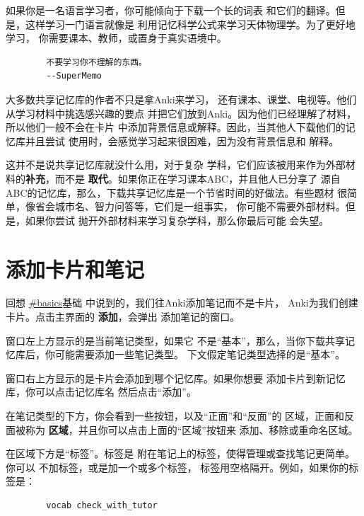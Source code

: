 \documentclass[a4paper]{book}
\begin{document}
	如果你是一名语言学习者，你可能倾向于下载一个长的词表 和它们的翻译。但是，这样学习一门语言就像是 利用记忆科学公式来学习天体物理学。为了更好地学习， 你需要课本、教师，或置身于真实语境中。
	
	\begin{shaded}\begin{verbatim}
		不要学习你不理解的东西。
		--SuperMemo
		\end{verbatim}\end{shaded}
	
	大多数共享记忆库的作者不只是拿Anki来学习， 还有课本、课堂、电视等。他们从学习材料中挑选感兴趣的要点 并把它们放到Anki。因为他们已经理解了材料，所以他们一般不会在卡片 中添加背景信息或解释。因此，当其他人下载他们的记忆库并且尝试 使用时，会感觉学习起来很困难，因为没有背景信息和 解释。
	
	这并不是说共享记忆库就没什么用，对于复杂 学科，它们应该被用来作为外部材料的\textbf{补充}，而不是 \textbf{取代}。如果你正在学习课本ABC，并且他人已分享了 源自ABC的记忆库，那么，下载共享记忆库是一个节省时间的好做法。有些题材 很简单，像省会城市名、智力问答等，它们是一组事实， 你可能不需要外部材料。但是，如果你尝试 抛开外部材料来学习复杂学科，那么你最后可能 会失望。
	
	\section{添加卡片和笔记}
	
	回想 \url{#basics}基础 中说到的，我们往Anki添加笔记而不是卡片， Anki为我们创建卡片。点击主界面的 \textbf{添加}，会弹出 添加笔记的窗口。
	
	窗口左上方显示的是当前笔记类型，如果它 不是“基本”，那么，当你下载共享记忆库后，你可能需要添加一些笔记类型。 下文假定笔记类型选择的是“基本”。
	
	窗口右上方显示的是卡片会添加到哪个记忆库。如果你想要 添加卡片到新记忆库，你可以点击记忆库名 然后点击“添加”。
	
	在笔记类型的下方，你会看到一些按钮，以及“正面”和“反面”的 区域，正面和反面被称为 \textbf{区域}，并且你可以点击上面的“区域”按钮来 添加、移除或重命名区域。
	
	在区域下方是“标签”。标签是 附在笔记上的标签，使得管理或查找笔记更简单。你可以 不加标签，或是加一个或多个标签， 标签用空格隔开。例如，如果你的标签是：
	
	\begin{shaded}\begin{verbatim}
		vocab check_with_tutor
		\end{verbatim}\end{shaded}
	
\end{document}
